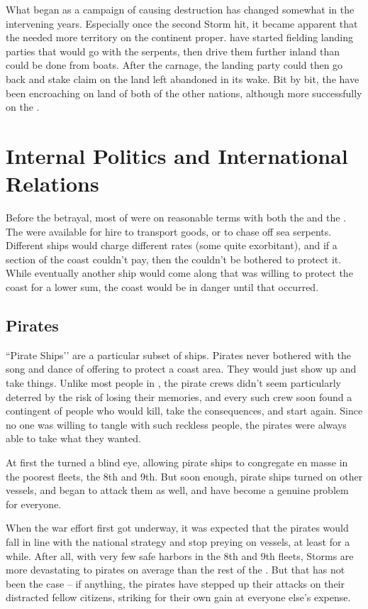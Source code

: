 \documentclass[blue]{GL2020}
\begin{document}
What began as a campaign of causing destruction has changed somewhat in the intervening years. Especially once the second Storm hit, it became apparent that the \pShip{} needed more territory on the continent proper. \pShippies{} have started fielding landing parties that would go with the serpents, then drive them further inland than could be done from boats. After the carnage, the landing party could then go back and stake claim on the land left abandoned in its wake. Bit by bit, the \pShip{} have been encroaching on land of both of the other nations, although more successfully on the \pFarm{}.

\section*{Internal Politics and International Relations}
Before the betrayal, most of \pShip{} were on reasonable terms with both the \pFarm{} and the \pTech{}. The \pShippies{} were available for hire to transport goods, or to chase off sea serpents. Different ships would charge different rates (some quite exorbitant), and if a section of the coast couldn’t pay, then the \pShip{} couldn’t be bothered to protect it. While eventually another ship would come along that was willing to protect the coast for a lower sum, the coast would be in danger until that occurred.

\subsection{Pirates}
``Pirate Ships’’ are a particular subset of \pShip{} ships. Pirates never bothered with the song and dance of offering to protect a coast area. They would just show up and take things. Unlike most people in \pEarth{}, the pirate crews didn’t seem particularly deterred by the risk of losing their memories, and every such crew soon found a contingent of people who would kill, take the consequences, and start again. Since no one was willing to tangle with such reckless people, the pirates were always able to take what they wanted. 

At first the \pShip{} turned a blind eye, allowing pirate ships to congregate en masse in the poorest fleets, the 8th and 9th. But soon enough, pirate ships turned on other \pShippie{} vessels, and began to attack them as well, and have become a genuine problem for everyone.

When the war effort first got underway, it was expected that the pirates would fall in line with the national strategy and stop preying on \pShippie{} vessels, at least for a while. After all, with very few safe harbors in the 8th and 9th fleets, Storms are more devastating to pirates on average than the rest of the \pShip{}. But that has not been the case -- if anything, the pirates have stepped up their attacks on their distracted fellow citizens, striking for their own gain at everyone else’s expense.
\end{document}
